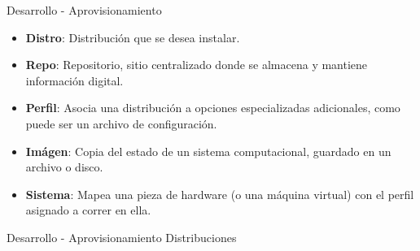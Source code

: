 \begin{frame}{Desarrollo - Aprovisionamiento}
    \vspace{-1.5cm}
    \begin{itemize}
        \item \textbf{Distro}: Distribución que se desea instalar. 
        \item \textbf{Repo}: Repositorio, sitio centralizado donde se almacena y mantiene información digital.
        \item \textbf{Perfil}: Asocia una distribución a opciones especializadas adicionales, como puede ser un archivo de configuración.
        \item \textbf{Imágen}: Copia del estado de un sistema computacional, guardado en un archivo o disco.
        \item \textbf{Sistema}: Mapea una pieza de hardware (o una máquina virtual) con el perfil asignado a correr en ella. 
    \end{itemize}

\end{frame}

\begin{frame}{Desarrollo - Aprovisionamiento}
    \vspace{0cm} {Distribuciones}
    \vspace{0cm}
    \begin{figure}[ht]
       \centering
    \end{figure}

\end{frame}


